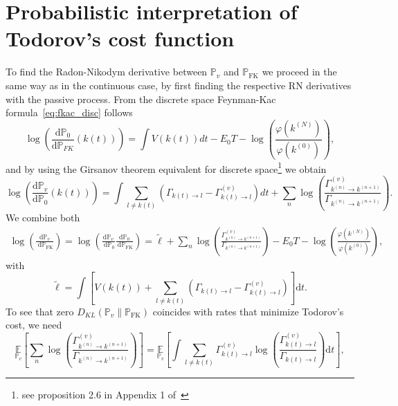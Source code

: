 \section{Probabilistic interpretation of Todorov's cost function}
\label{app:todorov-prob}
To find the Radon-Nikodym derivative between $\mathbb{P}_v$ and $\mathbb{P}_{\mathrm{FK}}$ we proceed in the same way as in the continuous case, by first finding the respective RN derivatives with the passive process. From the discrete space Feynman-Kac formula~\eqref{eq:fkac_disc} follows
\begin{equation}
	\log \left(\frac{\mathrm{d} \mathbb{P}_{0}}{\mathrm{d} \mathbb{P}_{F K}}(k(t))\right)=\int V(k(t)) d t-E_{0} T-\log \left(\frac{\varphi(k^{(N)})}{\varphi(k^{(0)})}\right),
\end{equation}
and by using the Girsanov theorem equivalent for discrete space\footnote{see proposition 2.6 in Appendix 1 of~\cite{kipnis1998scaling}} we obtain
\begin{equation}
	\log \left(\frac{\mathrm{d} \mathbb{P}_{v}}{\mathrm{d} \mathbb{P}_{0}}(k(t))\right)
	=
	\int \sum_{l \neq k(t)}\left(\Gamma_{k(t) \rightarrow l}-\Gamma_{k(t) \rightarrow l}^{(v)}\right) d t+\sum_{n} \log \left(\frac{\Gamma_{k^{(n)} \rightarrow k^{(n+1)}}^{(v)}}{\Gamma_{k^{(n)} \rightarrow k^{(n+1)}}}\right).
\end{equation}
We combine both
\begin{equation}
	\begin{aligned}
	\log \left(\frac{\mathrm{d} \mathbb{P}_{v}}{\mathrm{~d} \mathbb{P}_{\mathrm{FK}}}\right)
	=
	\log \left(\frac{\mathrm{d} \mathbb{P}_{v}}{\mathrm{~d} \mathbb{P}_{0}} \frac{\mathrm{d} \mathbb{P}_{0}}{\mathrm{~d} \mathbb{P}_{\mathrm{FK}}}\right)
	= \tilde \ell
	+\sum_{n} \log \left(\frac{\Gamma_{k^{(n)} \rightarrow k^{(n+1)}}^{(v)}}{\Gamma_{k^{(n)} \rightarrow k^{(n+1)}}}\right)-E_{0} T-\log \left(\frac{\varphi(k^{(N)})}{\varphi(k^{(0)})}\right),
	\end{aligned}
\end{equation}
with
\begin{equation}
	\tilde \ell = \int \left[V(k(t))+\sum_{l \neq k(t)}\left(\Gamma_{k(t) \rightarrow l}-\Gamma_{k(t) \rightarrow l}^{(v)}\right)\right] \mathrm{d}t.
\end{equation}
To see that zero $D_{K L}\left(\mathbb{P}_{v} \| \mathbb{P}_{\mathrm{F K}}\right)$ coincides with rates that minimize Todorov's cost, we need
\begin{equation}
	\underset{\mathbb{P}_v}{\mathbb{E}}
	\left[
	\sum_{n} \log \left(\frac{\Gamma_{k^{(n)} \rightarrow k^{(n+1)}}^{(v)}}{\Gamma_{k^{(n)} \rightarrow k^{(n+1)}}}\right)
	\right]
	= 
	\underset{\mathbb{P}_v}{\mathbb{E}} 
	\left[
	\int 
	\sum_{l \neq k(t)}
	\Gamma_{k(t) \rightarrow l}^{(v)} \log \left(\frac{\Gamma_{k(t) \rightarrow l}^{(v)}}{\Gamma_{k(t) \rightarrow l}}\right) \mathrm{d} t
	\right],
\end{equation}
